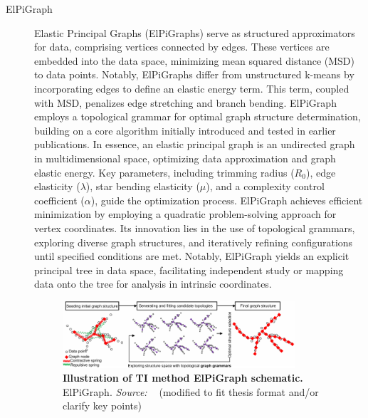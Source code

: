 \begin{description}
    \item[ElPiGraph]
    Elastic Principal Graphs (ElPiGraphs) \citep{albergante2020ElPiGraph} serve as structured approximators for data, comprising vertices connected by edges. These vertices are embedded into the data space, minimizing mean squared distance (MSD) to data points. Notably, ElPiGraphs differ from unstructured k-means by incorporating edges to define an elastic energy term. This term, coupled with MSD, penalizes edge stretching and branch bending. ElPiGraph employs a topological grammar for optimal graph structure determination, building on a core algorithm initially introduced and tested in earlier publications\citep{gorban2007topological}. In essence, an elastic principal graph is an undirected graph in multidimensional space, optimizing data approximation and graph elastic energy. Key parameters, including trimming radius ($R_0$), edge elasticity ($\lambda$), star bending elasticity ($\mu$), and a complexity control coefficient ($\alpha$), guide the optimization process. ElPiGraph achieves efficient minimization by employing a quadratic problem-solving approach for vertex coordinates. Its innovation lies in the use of topological grammars, exploring diverse graph structures, and iteratively refining configurations until specified conditions are met. Notably, ElPiGraph yields an explicit principal tree in data space, facilitating independent study or mapping data onto the tree for analysis in intrinsic coordinates. 
    
     \begin{figure}[ht!]
    	\centering
    	\includegraphics[width=0.85\textwidth]{TI_Alg_ElPiGraph/fig}
    	\vspace{0.1cm}
    	\caption[Illustration of TI method ElPiGraph schematic.]{\textbf{Illustration of TI method ElPiGraph schematic.} ElPiGraph. \emph{Source: ~\cite{cao2019monocle3}} (modified to fit thesis format and/or clarify key points)
    	}
    	\label{fig:TI_Alg_ElPiGraph}
    \end{figure}


\end{description}
